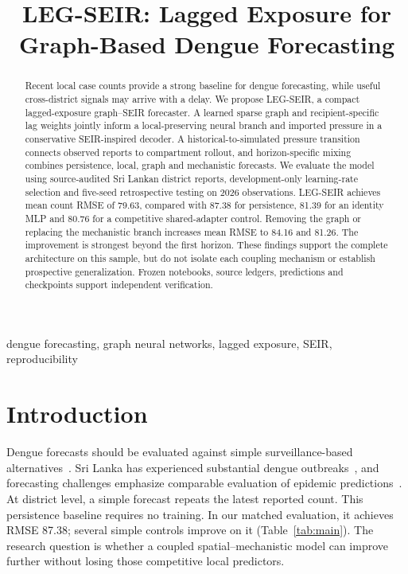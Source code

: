\documentclass[conference]{IEEEtran}
\begin{document}
\title{LEG-SEIR: Lagged Exposure for Graph-Based Dengue Forecasting}
\author{}
\maketitle
\begin{abstract}
Recent local case counts provide a strong baseline for dengue forecasting, while useful cross-district signals may arrive with a delay. We propose LEG-SEIR, a compact lagged-exposure graph--SEIR forecaster. A learned sparse graph and recipient-specific lag weights jointly inform a local-preserving neural branch and imported pressure in a conservative SEIR-inspired decoder. A historical-to-simulated pressure transition connects observed reports to compartment rollout, and horizon-specific mixing combines persistence, local, graph and mechanistic forecasts. We evaluate the model using source-audited Sri Lankan district reports, development-only learning-rate selection and five-seed retrospective testing on 2026 observations. LEG-SEIR achieves mean count RMSE of 79.63, compared with 87.38 for persistence, 81.39 for an identity MLP and 80.76 for a competitive shared-adapter control. Removing the graph or replacing the mechanistic branch increases mean RMSE to 84.16 and 81.26. The improvement is strongest beyond the first horizon. These findings support the complete architecture on this sample, but do not isolate each coupling mechanism or establish prospective generalization. Frozen notebooks, source ledgers, predictions and checkpoints support independent verification.
\end{abstract}
\begin{IEEEkeywords}
dengue forecasting, graph neural networks, lagged exposure, SEIR, reproducibility
\end{IEEEkeywords}

\section{Introduction}
Dengue forecasts should be evaluated against simple surveillance-based alternatives~\cite{johansson2016evaluation,johansson2019challenge}. Sri Lanka has experienced substantial dengue outbreaks~\cite{tissera2020severe}, and forecasting challenges emphasize comparable evaluation of epidemic predictions~\cite{johansson2019challenge}. At district level, a simple forecast repeats the latest reported count. This persistence baseline requires no training. In our matched evaluation, it achieves RMSE 87.38; several simple controls improve on it (Table~\ref{tab:main}). The research question is whether a coupled spatial--mechanistic model can improve further without losing those competitive local predictors.
\end{document}
